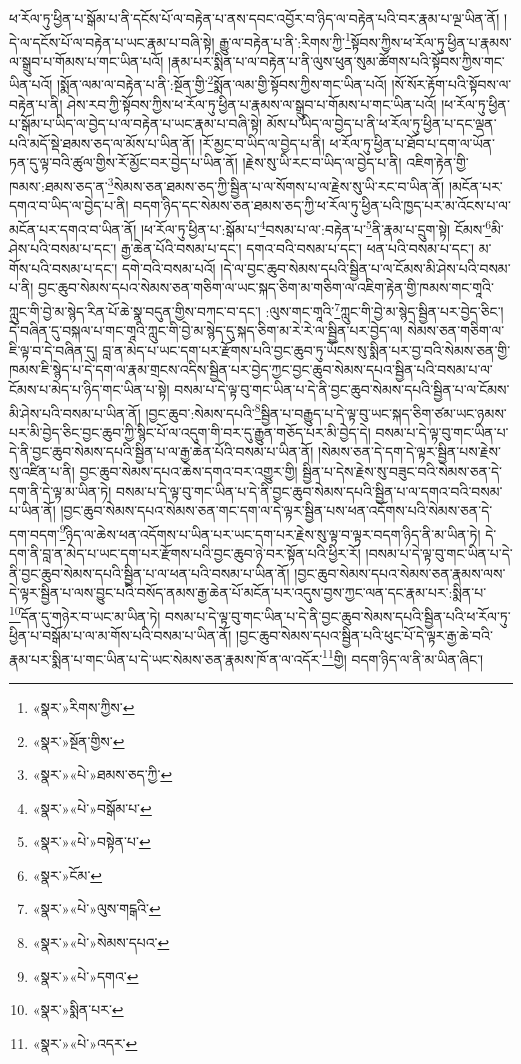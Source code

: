 ཕ་རོལ་ཏུ་ཕྱིན་པ་སྒོམ་པ་ནི་དངོས་པོ་ལ་བརྟེན་པ་ནས་དབང་འབྱོར་བ་ཉིད་ལ་བརྟེན་པའི་བར་རྣམ་པ་ལྔ་ཡིན་ནོ། །དེ་ལ་དངོས་པོ་ལ་བརྟེན་པ་ཡང་རྣམ་པ་བཞི་སྟེ། རྒྱུ་ལ་བརྟེན་པ་ནི་:རིགས་ཀྱི་\footnote{«སྣར་»རིགས་ཀྱིས་}སྟོབས་ཀྱིས་ཕ་རོལ་ཏུ་ཕྱིན་པ་རྣམས་ལ་སྒྲུབ་པ་གོམས་པ་གང་ཡིན་པའོ། །རྣམ་པར་སྨིན་པ་ལ་བརྟེན་པ་ནི་ལུས་ཕུན་སུམ་ཚོགས་པའི་སྟོབས་ཀྱིས་གང་ཡིན་པའོ། །སྨོན་ལམ་ལ་བརྟེན་པ་ནི་:སྔོན་གྱི་\footnote{«སྣར་»སྔོན་གྱིས་}སྨོན་ལམ་གྱི་སྟོབས་ཀྱིས་གང་ཡིན་པའོ། །སོ་སོར་རྟོག་པའི་སྟོབས་ལ་བརྟེན་པ་ནི། ཤེས་རབ་ཀྱི་སྟོབས་ཀྱིས་ཕ་རོལ་ཏུ་ཕྱིན་པ་རྣམས་ལ་སྒྲུབ་པ་གོམས་པ་གང་ཡིན་པའོ། །ཕ་རོལ་ཏུ་ཕྱིན་པ་སྒོམ་པ་ཡིད་ལ་བྱེད་པ་ལ་བརྟེན་པ་ཡང་རྣམ་པ་བཞི་སྟེ། མོས་པ་ཡིད་ལ་བྱེད་པ་ནི་ཕ་རོལ་ཏུ་ཕྱིན་པ་དང་ལྡན་པའི་མདོ་སྡེ་ཐམས་ཅད་ལ་མོས་པ་ཡིན་ནོ། །རོ་མྱང་བ་ཡིད་ལ་བྱེད་པ་ནི། ཕ་རོལ་ཏུ་ཕྱིན་པ་ཐོབ་པ་དག་ལ་ཡོན་ཏན་དུ་ལྟ་བའི་ཚུལ་གྱིས་རོ་མྱོང་བར་བྱེད་པ་ཡིན་ནོ། །རྗེས་སུ་ཡི་རང་བ་ཡིད་ལ་བྱེད་པ་ནི། འཇིག་རྟེན་གྱི་ཁམས་:ཐམས་ཅད་ན་\footnote{«སྣར་»«པེ་»ཐམས་ཅད་ཀྱི་}སེམས་ཅན་ཐམས་ཅད་ཀྱི་སྦྱིན་པ་ལ་སོགས་པ་ལ་རྗེས་སུ་ཡི་རང་བ་ཡིན་ནོ། །མངོན་པར་དགའ་བ་ཡིད་ལ་བྱེད་པ་ནི། བདག་ཉིད་དང་སེམས་ཅན་ཐམས་ཅད་ཀྱི་ཕ་རོལ་ཏུ་ཕྱིན་པའི་ཁྱད་པར་མ་འོངས་པ་ལ་མངོན་པར་དགའ་བ་ཡིན་ནོ། །ཕ་རོལ་ཏུ་ཕྱིན་པ་:སྒོམ་པ་\footnote{«སྣར་»«པེ་»བསྒོམ་པ་}བསམ་པ་ལ་:བརྟེན་པ་\footnote{«སྣར་»«པེ་»བསྟེན་པ་}ནི་རྣམ་པ་དྲུག་སྟེ། ངོམས་\footnote{«སྣར་»ངོམ་}མི་ཤེས་པའི་བསམ་པ་དང་། རྒྱ་ཆེན་པོའི་བསམ་པ་དང་། དགའ་བའི་བསམ་པ་དང་། ཕན་པའི་བསམ་པ་དང་། མ་གོས་པའི་བསམ་པ་དང་། དགེ་བའི་བསམ་པའོ། །དེ་ལ་བྱང་ཆུབ་སེམས་དཔའི་སྦྱིན་པ་ལ་ངོམས་མི་ཤེས་པའི་བསམ་པ་ནི། བྱང་ཆུབ་སེམས་དཔའ་སེམས་ཅན་གཅིག་ལ་ཡང་སྐད་ཅིག་མ་གཅིག་ལ་འཇིག་རྟེན་གྱི་ཁམས་གང་གཱའི་ཀླུང་གི་བྱེ་མ་སྙེད་རིན་པོ་ཆེ་སྣ་བདུན་གྱིས་བཀང་བ་དང་། :ལུས་གང་གཱའི་\footnote{«སྣར་»«པེ་»ལུས་གངྒའི་}ཀླུང་གི་བྱེ་མ་སྙེད་སྦྱིན་པར་བྱེད་ཅིང་། དེ་བཞིན་དུ་བསྐལ་པ་གང་གཱའི་ཀླུང་གི་བྱེ་མ་སྙེད་དུ་སྐད་ཅིག་མ་རེ་རེ་ལ་སྦྱིན་པར་བྱེད་ལ། སེམས་ཅན་གཅིག་ལ་ཇི་ལྟ་བ་དེ་བཞིན་དུ། བླ་ན་མེད་པ་ཡང་དག་པར་རྫོགས་པའི་བྱང་ཆུབ་ཏུ་ཡོངས་སུ་སྨིན་པར་བྱ་བའི་སེམས་ཅན་གྱི་ཁམས་ཇི་སྙེད་པ་དེ་དག་ལ་རྣམ་གྲངས་འདིས་སྦྱིན་པར་བྱེད་ཀྱང་བྱང་ཆུབ་སེམས་དཔའ་སྦྱིན་པའི་བསམ་པ་ལ་ངོམས་པ་མེད་པ་ཉིད་གང་ཡིན་པ་སྟེ། བསམ་པ་དེ་ལྟ་བུ་གང་ཡིན་པ་དེ་ནི་བྱང་ཆུབ་སེམས་དཔའི་སྦྱིན་པ་ལ་ངོམས་མི་ཤེས་པའི་བསམ་པ་ཡིན་ནོ། །བྱང་ཆུབ་:སེམས་དཔའི་\footnote{«སྣར་»«པེ་»སེམས་དཔའ་}སྦྱིན་པ་བརྒྱུད་པ་དེ་ལྟ་བུ་ཡང་སྐད་ཅིག་ཙམ་ཡང་ཉམས་པར་མི་བྱེད་ཅིང་བྱང་ཆུབ་ཀྱི་སྙིང་པོ་ལ་འདུག་གི་བར་དུ་རྒྱུན་གཅོད་པར་མི་བྱེད་དེ། བསམ་པ་དེ་ལྟ་བུ་གང་ཡིན་པ་དེ་ནི་བྱང་ཆུབ་སེམས་དཔའི་སྦྱིན་པ་ལ་རྒྱ་ཆེན་པོའི་བསམ་པ་ཡིན་ནོ། །སེམས་ཅན་དེ་དག་དེ་ལྟར་སྦྱིན་པས་རྗེས་སུ་འཛིན་པ་ནི། བྱང་ཆུབ་སེམས་དཔའ་ཆེས་དགའ་བར་འགྱུར་གྱི། སྦྱིན་པ་དེས་རྗེས་སུ་བཟུང་བའི་སེམས་ཅན་དེ་དག་ནི་དེ་ལྟ་མ་ཡིན་ཏེ། བསམ་པ་དེ་ལྟ་བུ་གང་ཡིན་པ་དེ་ནི་བྱང་ཆུབ་སེམས་དཔའི་སྦྱིན་པ་ལ་དགའ་བའི་བསམ་པ་ཡིན་ནོ། །བྱང་ཆུབ་སེམས་དཔའ་སེམས་ཅན་གང་དག་ལ་དེ་ལྟར་སྦྱིན་པས་ཕན་འདོགས་པའི་སེམས་ཅན་དེ་དག་བདག་\footnote{«སྣར་»«པེ་»དགའ་}ཉིད་ལ་ཆེས་ཕན་འདོགས་པ་ཡིན་པར་ཡང་དག་པར་རྗེས་སུ་ལྟ་བ་ལྟར་བདག་ཉིད་ནི་མ་ཡིན་ཏེ། དེ་དག་ནི་བླ་ན་མེད་པ་ཡང་དག་པར་རྫོགས་པའི་བྱང་ཆུབ་ཉེ་བར་སྟོན་པའི་ཕྱིར་རོ། །བསམ་པ་དེ་ལྟ་བུ་གང་ཡིན་པ་དེ་ནི་བྱང་ཆུབ་སེམས་དཔའི་སྦྱིན་པ་ལ་ཕན་པའི་བསམ་པ་ཡིན་ནོ། །བྱང་ཆུབ་སེམས་དཔའ་སེམས་ཅན་རྣམས་ལས་དེ་ལྟར་སྦྱིན་པ་ལས་བྱུང་པའི་བསོད་ནམས་རྒྱ་ཆེན་པོ་མངོན་པར་འདུས་བྱས་ཀྱང་ལན་དང་རྣམ་པར་:སྨིན་པ་\footnote{«སྣར་»སྨིན་པར་}དོན་དུ་གཉེར་བ་ཡང་མ་ཡིན་ཏེ། བསམ་པ་དེ་ལྟ་བུ་གང་ཡིན་པ་དེ་ནི་བྱང་ཆུབ་སེམས་དཔའི་སྦྱིན་པའི་ཕ་རོལ་ཏུ་ཕྱིན་པ་བསྒོམ་པ་ལ་མ་གོས་པའི་བསམ་པ་ཡིན་ནོ། །བྱང་ཆུབ་སེམས་དཔའ་སྦྱིན་པའི་ཕུང་པོ་དེ་ལྟར་རྒྱ་ཆེ་བའི་རྣམ་པར་སྨིན་པ་གང་ཡིན་པ་དེ་ཡང་སེམས་ཅན་རྣམས་ཁོ་ན་ལ་འདོར་\footnote{«སྣར་»«པེ་»འདར་}གྱི། བདག་ཉིད་ལ་ནི་མ་ཡིན་ཞིང་། 